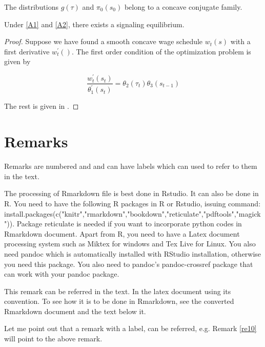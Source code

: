 \documentclass[12pt,svgnames]{article}
\begin{document}
\begin{assumption}
\label{A2}The distributions $g\left( \tau \right)$ and $\pi _{0}\left( s_{0}\right)$ belong to a concave conjugate family.
\end{assumption}

\begin{theorem}
Under \autoref{A1} and \autoref{A2}, there exists a signaling equilibrium.
\end{theorem}

\begin{proof}
Suppose we have found a smooth concave wage schedule $w_{t}\left( s\right)$
with a first derivative $w_{t}^{\prime }\left( {}\right)$. The first order
condition of the optimization problem is given by 

\begin{equation}
 \frac{w_{t}^{\prime }\left( s_{t}\right) }{\theta _{1}^{\prime }\left( s_{t}\right) }=
 \theta _{2}\left( \tau _{t}\right) \theta _{3}\left( s_{t-1}\right) \label{eq10}
\end{equation}

The rest is given in \cite{Raut_2017a}.

\end{proof}

\section{Remarks} \label{sec8}

Remarks are numbered and and can have labels which can used to refer to them in the text.


\begin{remark}
The processing of Rmarkdown file is best done in Rstudio. It can also be done in R. You need to have the following R packages in R or Rstudio, issuing command: install.packages(c("knitr","rmarkdown","bookdown","reticulate","pdftools","magick")). Package reticulate is needed if you want to incorporate python codes in Rmarkdown document. Apart from R, you need to have a Latex document processing system such as Miktex for windows and Tex Live for Linux.  You also need pandoc which is automatically installed with RStudio installation, otherwise you need this package. You also need to pandoc's pandoc-crossref package that can work with your pandoc package.  
\end{remark}


\begin{remark}
\label{re10}This remark can be referred in the text. In the latex document using its convention. To see how it is to be done in Rmarkdown, see the converted Rmarkdown document and the text below it.
\end{remark}

Let me point out that a remark with a label, can be referred, e.g. Remark \ref{re10} will point to the above remark.  

\printbibliography
\end{document}
